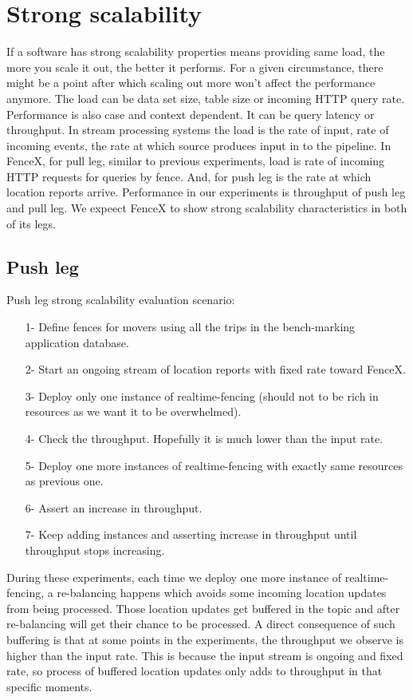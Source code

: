 \documentclass[a4]{report}
\begin{document}
    \section{Strong scalability}
    If a software has strong scalability properties means providing same load, the more you scale it out, the better
    it performs.
    For a given circumstance, there might be a point after which scaling out more won't affect the performance anymore.
    The load can be data set size, table size or incoming HTTP query rate.
    Performance is also case and context dependent.
    It can be query latency or throughput.
    In stream processing systems the load is the rate of input, rate of incoming events, the rate at which source
    produces input in to the pipeline.
    In FenceX, for pull leg, similar to previous experiments, load is rate of incoming HTTP requests for queries by fence.
    And, for push leg is the rate at which location reports arrive.
    Performance in our experiments is throughput of push leg and pull leg.
    We expeect FenceX to show strong scalability characteristics in both of its legs.

    \subsection{Push leg}
    Push leg strong scalability evaluation scenario:
    \begin{itemize}
        \item[1-] Define fences for movers using all the trips in the bench-marking application database.
        \item[2-] Start an ongoing stream of location reports with fixed rate toward FenceX.
        \item[3-] Deploy only one instance of realtime-fencing (should not to be rich in resources as we want it to
        be overwhelmed).
        \item[4-] Check the throughput.
        Hopefully it is much lower than the input rate.
        \item[5-] Deploy one more instances of realtime-fencing with exactly same resources as previous one.
        \item[6-] Assert an increase in throughput.
        \item[7-] Keep adding instances and asserting increase in throughput until throughput stops increasing.
    \end{itemize}

    During these experiments, each time we deploy one more instance of realtime-fencing, a re-balancing happens which
    avoids some incoming location updates from being processed.
    Those location updates get buffered in the topic and after re-balancing will get their chance to be processed.
    A direct consequence of such buffering is that at some points in the experiments, the throughput we observe is
    higher than the input rate.
    This is because the input stream is ongoing and fixed rate, so process of buffered location updates only adds to
    throughput in that specific moments.
\end{document}
